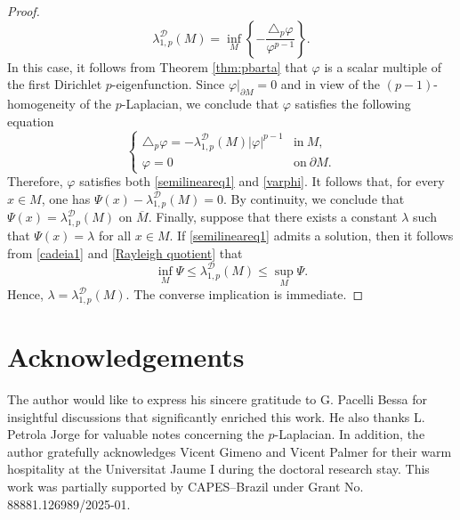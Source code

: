 \documentclass{article}
\begin{document}
\begin{proof}
\begin{equation*}
      \lambda_{1,p}^{\mathcal{D}}(M) = \inf_{M} \left\{ -\frac{\triangle_p \varphi}{\varphi^{p-1}}  \right\}.
\end{equation*}
In this case, it follows from Theorem \ref{thm:pbarta} that $\varphi$ is a scalar multiple of the first Dirichlet $p$-eigenfunction. Since $\varphi|_{\partial M}=0$ and in view of the $(p-1)$-homogeneity of the $p$-Laplacian, we conclude that $\varphi$ satisfies the following equation
\begin{equation}\label{varphi}
\begin{cases}
\triangle_p \varphi = -\lambda_{1,p}^{\mathcal{D}}(M)|\varphi|^{p-1} 
& \text{in} \ M,\\
\varphi = 0 
& \text{on} \ \partial M. 
\end{cases}
\end{equation}
Therefore, $\varphi$ satisfies both \eqref{semilineareq1} and \eqref{varphi}. It follows that, for every $x \in M$, one has $\Psi(x) - \lambda_{1,p}^{\mathcal{D}}(M) = 0$. By continuity, we conclude that $\Psi(x) = \lambda_{1,p}^{\mathcal{D}}(M)$ on $\overline{M}$. Finally, suppose that there exists a constant $\lambda$ such that $\Psi(x)=\lambda$ for all $x \in M$. If \eqref{semilineareq1} admits a solution, then it follows from \eqref{cadeia1} and \eqref{Rayleigh quotient} that
\[
\inf_M \Psi \le \lambda_{1,p}^{\mathcal{D}}(M) \le \sup_M \Psi.
\]
Hence, $\lambda = \lambda_{1,p}^{\mathcal{D}}(M)$. The converse implication is immediate.
\end{proof}

\section*{Acknowledgements}

The author would like to express his sincere gratitude to G. Pacelli Bessa for insightful discussions that significantly enriched this work. He also thanks L. Petrola Jorge for valuable notes concerning the $p$-Laplacian. In addition, the author gratefully acknowledges Vicent Gimeno and Vicent Palmer for their warm hospitality at the Universitat Jaume I during the doctoral research stay. This work was partially supported by CAPES--Brazil under Grant No. 88881.126989/2025-01.
\end{document}
